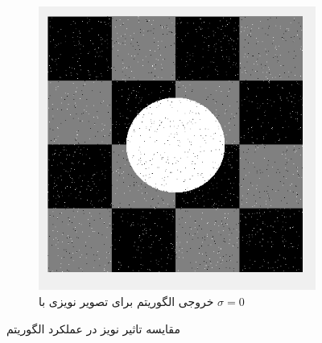 \documentclass[11.5pt,a4paper]{article}
\begin{document}
\begin{figure}[h]
\begin{subfigure}{0.3\textwidth}
	\end{subfigure}	
	\begin{subfigure}{0.3\textwidth}
	\includegraphics[scale=0.3]{Imgs/MRF_Iter4_TLin.png}
	\caption{خروجی الگوریتم برای تصویر نویزی با $\sigma=0$}
	\end{subfigure}	
\caption{مقایسه تاثیر نویز در عملکرد الگوریتم}
\label{fig:Noise}
\end{figure}


\end{document}
